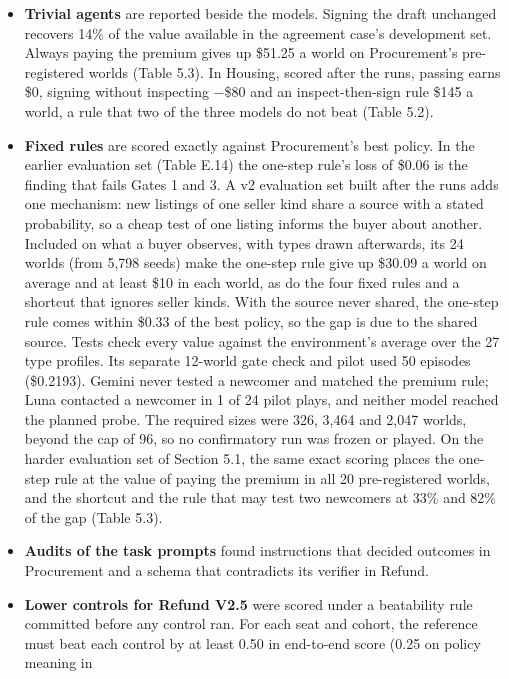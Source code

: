 \begin{itemize}
\tightlist
\item
  \textbf{Trivial agents} are reported beside the models. Signing the draft unchanged recovers 14\% of the value available
  in the agreement case's development set. Always paying the premium gives up \$51.25 a world on Procurement's
  pre-registered worlds (Table 5.3). In Housing, scored after the runs, passing earns \$0, signing without inspecting
  −\$80 and an inspect-then-sign rule \$145 a world, a rule that two of the three models do not beat (Table 5.2).
\item
  \textbf{Fixed rules} are scored exactly against Procurement's best policy. In the earlier evaluation set (Table E.14) the
  one-step rule's loss of \$0.06 is the finding that fails Gates 1 and 3. A v2 evaluation set built after the runs adds
  one mechanism: new listings of one seller kind share a source with a stated probability, so a cheap test of one
  listing informs the buyer about another. Included on what a buyer observes, with types drawn afterwards, its 24
  worlds (from 5,798 seeds) make the one-step rule give up \$30.09 a world on average and at least \$10 in each world, as
  do the four fixed rules and a shortcut that ignores seller kinds. With the source never shared, the one-step rule
  comes within \$0.33 of the best policy, so the gap is due to the shared source. Tests check every value against the
  environment's average over the 27 type profiles. Its separate 12-world gate check and pilot used 50 episodes
  (\$0.2193). Gemini never tested a newcomer and matched the premium rule; Luna contacted a newcomer in 1 of 24 pilot
  plays, and neither model reached the planned probe. The required sizes were 326, 3,464 and 2,047 worlds, beyond the
  cap of 96, so no confirmatory run was frozen or played. On the harder evaluation set of Section 5.1, the same exact
  scoring places the one-step rule at the value of paying the premium in all 20 pre-registered worlds, and the shortcut
  and the rule that may test two newcomers at 33\% and 82\% of the gap (Table 5.3).
\item
  \textbf{Audits of the task prompts} found instructions that decided outcomes in Procurement and a schema that contradicts
  its verifier in Refund.
\item
  \textbf{Lower controls for Refund V2.5} were scored under a beatability rule committed before any control ran. For each
  seat and cohort, the reference must beat each control by at least 0.50 in end-to-end score (0.25 on policy meaning in

\end{itemize}
